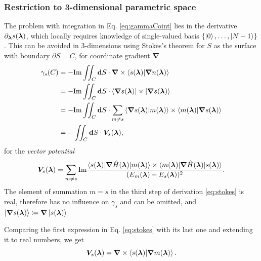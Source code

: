 \subsubsection{Restriction to 3-dimensional parametric space}
The problem with integration in Eq. \ref{eq:gammaCoint} lies in the derivative $\partial_{\bm\lambda} s({\bm\lambda})$, which locally requires knowledge of single-valued basis $\{\ket{0},\dots, \ket{N-1}\}$. This can be avoided in 3-dimensions using Stokes's theorem for $S$ as the surface with boundary $\partial S=C$, for coordinate gradient $\bm \nabla$
\begin{equation}
    \begin{split}
        \gamma_s(C) &= -\textrm{Im} \iint_C \bm{\mathrm{d}} S \cdot \bm \nabla \times \braket{s({\bm\lambda})|\bm \nabla n({\bm\lambda})}\\
         &= -\textrm{Im} \iint_C \bm{\mathrm{d}} S \cdot \braket{\bm \nabla s({\bm\lambda})|\times|\bm \nabla s({\bm\lambda})}\\
        &= -\textrm{Im} \iint_C \bm{\mathrm{d}} S \cdot \sum_{m\neq s} \braket{\bm \nabla s({\bm\lambda})|m({\bm\lambda})}\times \braket{m({\bm\lambda})|\bm \nabla s({\bm\lambda})}\\
        &= -\iint_C \bm{\mathrm{d}} S \cdot \bm V_s({\bm\lambda}),
    \end{split}
    \label{eq:stokes}
\end{equation}
for the \emph{vector potential}
\begin{equation}
    \bm V_s({\bm\lambda}) = \sum_{m\neq s} \textrm{Im} \frac{
            \braket{s({\bm\lambda})|\bm \nabla\hat{H}({\bm\lambda}) |m({\bm\lambda})}\times \braket{m({\bm\lambda})|\bm \nabla\hat{H}({\bm\lambda})|s({\bm\lambda})}    
             }{
(E_m({\bm\lambda})-E_s({\bm\lambda}))^2
             }.
\end{equation}
The element of summation $m=s$ in the third step of derivation \ref{eq:stokes} is real, therefore has no influence on $\gamma_s$ and can be omitted, and $\ket{\bm \nabla s({\bm\lambda})}\coloneqq\bm \nabla \ket{ s({\bm\lambda})}$.

Comparing the first expression in Eq. \ref{eq:stokes} with its last one and extending it to real numbers, we get 
\begin{equation}
    \bm V_s({\bm\lambda})=\bm \nabla\times\braket{s({\bm\lambda})|\bm \nabla m({\bm\lambda})}.
    \label{eq:vectorPotentialDef}  
\end{equation}

